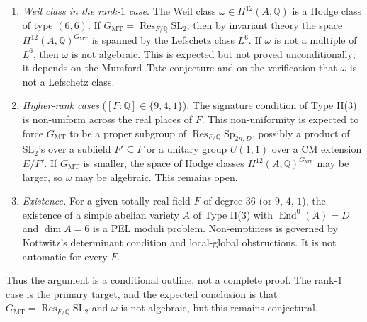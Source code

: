 \documentclass{article}
\begin{document}
\begin{enumerate}
\item \emph{Weil class in the rank-$1$ case.} The Weil class
$\omega \in H^{12}(A,\mathbb{Q})$ is a Hodge class of type $(6,6)$. If
$G_{\mathrm{MT}} = \operatorname{Res}_{F/\mathbb{Q}} \mathrm{SL}_2$, then by invariant
theory the space $H^{12}(A,\mathbb{Q})^{G_{\mathrm{MT}}}$ is spanned by the Lefschetz
class $L^6$. If $\omega$ is not a multiple of $L^6$, then $\omega$ is not algebraic.
This is expected but not proved unconditionally; it depends on the Mumford--Tate
conjecture and on the verification that $\omega$ is not a Lefschetz class.

\item \emph{Higher-rank cases} ($[F:\mathbb{Q}] \in \{9,4,1\}$). The signature condition
of Type II(3) is non-uniform across the real places of $F$. This non-uniformity is
expected to force $G_{\mathrm{MT}}$ to be a proper subgroup of
$\operatorname{Res}_{F/\mathbb{Q}} \mathrm{Sp}_{2n,D}$, possibly a product of
$\mathrm{SL}_2$'s over a subfield $F' \subseteq F$ or a unitary group $U(1,1)$ over a CM
extension $E/F'$. If $G_{\mathrm{MT}}$ is smaller, the space of Hodge classes
$H^{12}(A,\mathbb{Q})^{G_{\mathrm{MT}}}$ may be larger, so $\omega$ may be algebraic.
This remains open.

\item \emph{Existence.} For a given totally real field $F$ of degree $36$ (or $9$, $4$,
$1$), the existence of a simple abelian variety $A$ of Type II(3) with
$\operatorname{End}^0(A) = D$ and $\dim A = 6$ is a PEL moduli problem. Non-emptiness is
governed by Kottwitz's determinant condition and local-global obstructions. It is not
automatic for every $F$.
\end{enumerate}

Thus the argument is a conditional outline, not a complete proof. The rank-$1$ case is
the primary target, and the expected conclusion is that
$G_{\mathrm{MT}} = \operatorname{Res}_{F/\mathbb{Q}} \mathrm{SL}_2$ and $\omega$ is not
algebraic, but this remains conjectural.
\end{document}

